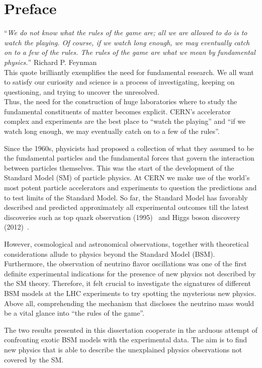 \chapter*{Preface}\label{chapter:introduction}
\enquote{\itshape {\small We do not know what the rules of the game are; all we are allowed to
do is to watch the playing. Of course, if we watch long enough, we may
eventually catch on to a few of the rules. The rules of the game are
what we mean by fundamental physics.}} Richard P. Feynman\\

This quote brilliantly exemplifies the need for fundamental
research. We all want to satisfy our 
curiosity and science is a process of investigating, keeping on
questioning, and trying to uncover the unresolved.\\
Thus, the need for the construction
of huge laboratories where to study the fundamental constituents of
matter becomes explicit.
CERN's accelerator complex and experiments are the
best place to ``watch the playing'' and ``if we watch long enough, we may
eventually catch on to a few of the rules''.

Since the 1960s, physicists had proposed a collection of what
they assumed to be the fundamental particles and the fundamental forces
 that govern the interaction between particles themselves. This was
 the start of the development of the Standard Model (SM) of particle
 physics. At CERN we make use of the world's
most potent particle accelerators and experiments to question the
predictions and to test limits of the Standard Model. So far,
the Standard Model has favorably described and predicted
approximately all experimental outcomes till the latest
discoveries such as top quark observation (1995)~\cite{Abachi_1995}
and Higgs boson discovery (2012)~\cite{20121,201230}.

However, cosmological and astronomical observations, together with theoretical
considerations allude to physics beyond the Standard Model
(BSM). Furthermore, the observation of neutrino flavor oscillations was one of the first 
definite experimental indications for the
presence of new physics not described by the SM theory.
 Therefore, it felt crucial to investigate the signatures of different
 BSM models at the LHC
experiments
to try spotting the mysterious new physics. Above all, comprehending the
mechanism that discloses the neutrino mass would be a
vital glance into ``the rules of the game''.

The two results presented in this dissertation cooperate in the arduous attempt of confronting exotic BSM
models with the experimental data. The aim is to find new
physics that is able to describe the unexplained
physics observations not covered by the SM.\\

